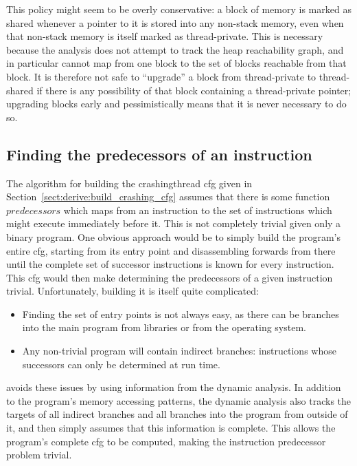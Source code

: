 {This policy might seem to be overly conservative: a block of memory is
marked as shared whenever a pointer to it is stored into any non-stack
memory, even when that non-stack memory is itself marked as
thread-private.  This is necessary because the analysis does not
attempt to track the heap reachability graph, and in particular cannot
map from one block to the set of blocks reachable from that block.  It
is therefore not safe to ``upgrade'' a block from thread-private to
thread-shared if there is any possibility of that block containing a
thread-private pointer; upgrading blocks early and pessimistically
means that it is never necessary to do so.


\subsection{Finding the predecessors of an instruction}
\label{sect:program_model:instr_predecessors}


The algorithm for building the \gls{crashingthread} \gls{cfg} given in
Section~\ref{sect:derive:build_crashing_cfg} assumes that there is
some function $\mathit{predecessors}$ which maps from an instruction
to the set of instructions which might execute immediately before it.
This is not completely trivial given only a binary program.  One
obvious approach would be to simply build the program's entire
\gls{cfg}, starting from its entry point and disassembling forwards
from there until the complete set of successor instructions is known
for every instruction.  This \gls{cfg} would then make determining the
predecessors of a given instruction trivial.  Unfortunately, building
it is itself quite complicated:

\begin{itemize}
\item Finding the set of entry points is not always easy, as there can
  be branches into the main program from libraries or from the
  operating system.
\item Any non-trivial program will contain indirect branches:
  instructions whose successors can only be determined at run time.
\end{itemize}

{\Implementation} avoids these issues by using information from the
dynamic analysis.  In addition to the program's memory accessing
patterns, the dynamic analysis also tracks the targets of all indirect
branches and all branches into the program from outside of it, and
then simply assumes that this information is complete.  This allows
the program's complete \gls{cfg} to be computed, making the
instruction predecessor problem trivial.

}
